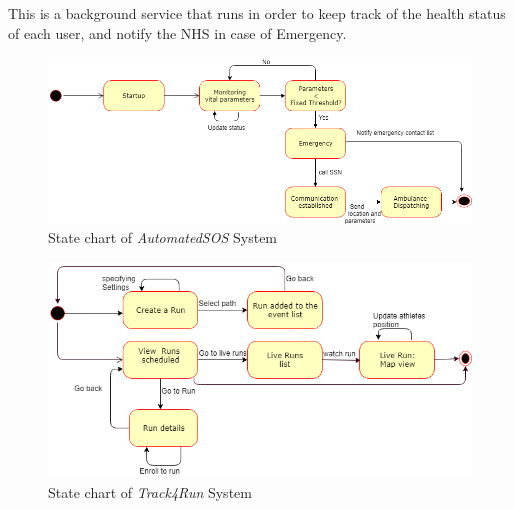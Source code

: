 This is a background service that runs in order to keep track of the health status of each user, and notify the NHS in case of Emergency.
\begin{figure}[H]
    \centering
    \includegraphics[scale=0.4]{Pictures/stateChart2.png}
    \caption{State chart of \emph{AutomatedSOS} System}
\end{figure}
\begin{figure}[H]
    \centering
    \includegraphics[scale=0.4]{Pictures/statechart3.png}
    \caption{State chart  of \emph{Track4Run} System}
\end{figure}
